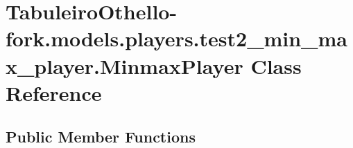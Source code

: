 \hypertarget{class_tabuleiro_othello-fork_1_1models_1_1players_1_1test2__min__max__player_1_1_minmax_player}{}\section{Tabuleiro\+Othello-\/fork.models.\+players.\+test2\+\_\+min\+\_\+max\+\_\+player.\+Minmax\+Player Class Reference}
\label{class_tabuleiro_othello-fork_1_1models_1_1players_1_1test2__min__max__player_1_1_minmax_player}
\subsection*{Public Member Functions}
